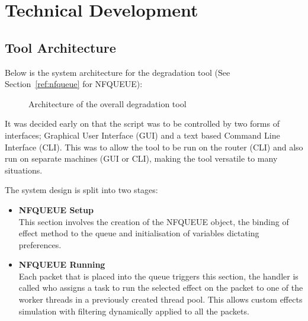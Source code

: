

\chapter{Technical Development}

%
\section{Tool Architecture}
Below is the system architecture for the degradation tool (See Section~\ref{ref:nfqueue} for NFQUEUE):

\begin{center}
	
	\begin{figure}[h]
		\caption{Architecture of the overall degradation tool}
	\end{figure}
\end{center}

It was decided early on that the script was to be controlled by two forms of interfaces; Graphical User Interface (GUI) and a text based Command Line Interface (CLI). This was to allow the tool to be run on the router (CLI) and also run on separate machines (GUI or CLI), making the tool versatile to many situations.

The system design is split into two stages:

\begin{itemize}
\item {\bf NFQUEUE Setup}\\
This section involves the creation of the NFQUEUE object, the binding of effect method to the queue and initialisation of variables dictating preferences.

\item {\bf NFQUEUE Running}\\
Each packet that is placed into the queue triggers this section, the handler is called who assigns a task to run the selected effect on the packet to one of the worker threads in a previously created thread pool. This allows custom effects simulation with filtering dynamically applied to all the packets.
\end{itemize}

